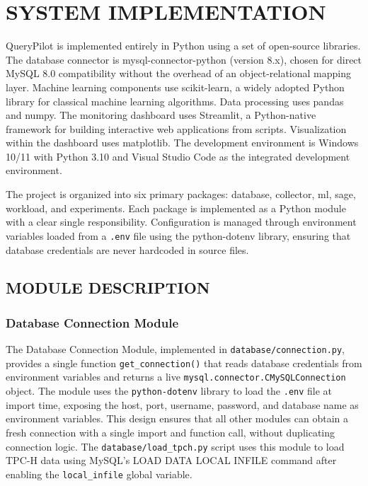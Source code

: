 
\chapter{SYSTEM IMPLEMENTATION}
\label{chap:implementation}

QueryPilot is implemented entirely in Python using a set of open-source
libraries. The database connector is mysql-connector-python (version 8.x),
chosen for direct MySQL 8.0 compatibility without the overhead of an
object-relational mapping layer. Machine learning components use scikit-learn,
a widely adopted Python library for classical machine learning algorithms.
Data processing uses pandas and numpy. The monitoring dashboard uses Streamlit,
a Python-native framework for building interactive web applications from
scripts. Visualization within the dashboard uses matplotlib. The development
environment is Windows 10/11 with Python 3.10 and Visual Studio Code as the
integrated development environment.

The project is organized into six primary packages: database, collector, ml,
sage, workload, and experiments. Each package is implemented as a Python module
with a clear single responsibility. Configuration is managed through environment
variables loaded from a \texttt{.env} file using the python-dotenv library,
ensuring that database credentials are never hardcoded in source files.

\section{MODULE DESCRIPTION}
\label{sec:module_description}

\subsection{Database Connection Module}
\label{subsec:db_connection}

The Database Connection Module, implemented in \texttt{database/connection.py},
provides a single function \texttt{get\_connection()} that reads database
credentials from environment variables and returns a live
\texttt{mysql.connector.CMySQLConnection} object. The module uses the
\texttt{python-dotenv} library to load the \texttt{.env} file at import time,
exposing the host, port, username, password, and database name as environment
variables. This design ensures that all other modules can obtain a fresh
connection with a single import and function call, without duplicating
connection logic. The \texttt{database/load\_tpch.py} script uses this
module to load TPC-H data using MySQL's LOAD DATA LOCAL INFILE command after
enabling the \texttt{local\_infile} global variable.

